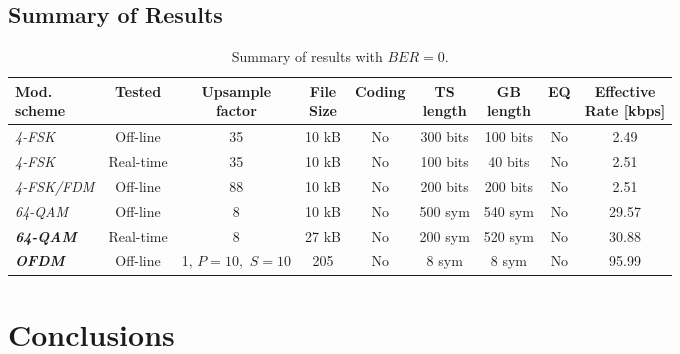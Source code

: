 \documentclass[12pt,a4paper,openright]{report}
\begin{document}
\section{Summary of Results}

\begin{table} [h]
\centering
\begin{tabular}{lcccccccc} 
\hline
\shortstack{\bf Mod. \\ \bf scheme} &  \bf{Tested}  & \shortstack{\bf Upsample\\ \bf factor} & \shortstack{\bf File \\ \bf Size }& \bf Coding & \bf \shortstack{\bf TS\\\bf length} & \shortstack{\bf GB \\\bf length} & \bf EQ  & \shortstack{\bf{Effective}\\\bf{Rate}\textnormal{ [kbps]}}\\
\hline
\emph{4-FSK}            &  Off-line             &    35        &  10 kB  &    No   &  300 bits   &  100 bits     &  No  & 2.49  \\  
\emph{4-FSK}            &  Real-time            &    35        &  10 kB &    No   &  100 bits   &  40 bits      &  No  & 2.51  \\  
\emph{4-FSK/FDM}      &  Off-line             &    88        &  10 kB &    No   &  200 bits   &  200 bits     &  No  & 2.51  \\  
\hline
\emph{64-QAM}            &  Off-line             &    8         &  10 kB  &    No   &  500 sym &  540 sym &  No  & 29.57   \\  
\bf\emph{64-QAM}            &  Real-time            &    8         &  27 kB &    No   &  200 sym &  520 sym &  No  & 30.88   \\
\hline
\bf\emph{OFDM}             &  Off-line             &  \shortstack{1, $P=10,$ \\ $S=10$}&  205 &    No   &  8 sym &  8 sym &  No  & 95.99 \\
\hline
\end{tabular}
\caption[Summary of results with $BER=0$.]{Summary of results with $BER=0$.}
\label{table:results}
\end{table}


\chapter{Conclusions}
\label{chap:conclusions}
\end{document}
